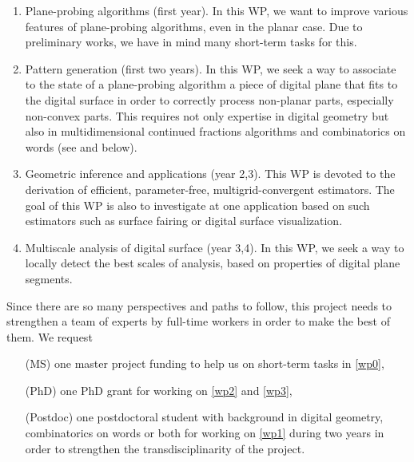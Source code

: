\begin{enumerate} [label=(W\arabic*),start=0]
\item Plane-probing algorithms (first year). In this WP, we want to
  improve various features of plane-probing algorithms, even in the
  planar case. Due to preliminary works, we have in mind many short-term tasks for this.  \label{wp0}
\item Pattern generation (first two years). In this WP, we seek a way to associate
  to the state of a plane-probing algorithm a piece of digital plane
  that fits to the digital surface in order to correctly process non-planar parts,
  especially non-convex parts. This requires not only expertise in
  digital geometry but also in multidimensional continued fractions
  algorithms and combinatorics on words (see  and below).  \label{wp1} 
\item Geometric inference and applications (year 2,3). This WP is devoted
  to the derivation of efficient, parameter-free, multigrid-convergent estimators.
  The goal of this WP is also to investigate at one application based on such
  estimators such as surface fairing or digital surface visualization. \label{wp2} 
\item Multiscale analysis of digital surface (year 3,4). In this WP, we
  seek a way to locally detect the best scales of analysis, based on properties
  of digital plane segments. \label{wp3}
\end{enumerate}

Since there are so many perspectives and paths to follow, this project needs
to strengthen a team of experts by full-time workers in order to make the best of them.
We request
\begin{itemize}
\item[(MS)] one master project funding to help us on short-term tasks in \ref{wp0},
\item[(PhD)] one PhD grant for working on \ref{wp2} and \ref{wp3},
\item[(Postdoc)] one postdoctoral student with background in digital geometry,
  combinatorics on words or both for working on \ref{wp1} during two years
  in order to strengthen the transdisciplinarity of the project. 
\end{itemize}



